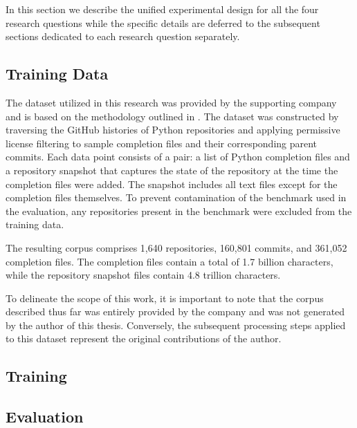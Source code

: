 In this section we describe the unified experimental design for all the four research questions while the specific details are deferred to the subsequent sections dedicated to each research question separately. %

\subsection{Training Data}

The dataset utilized in this research was provided by the supporting company and is based on the methodology outlined in \citet{bogomolov2024}. The dataset was constructed by traversing the GitHub histories of Python repositories and applying permissive license filtering to sample completion files and their corresponding parent commits. Each data point consists of a pair: a list of Python completion files and a repository snapshot that captures the state of the repository at the time the completion files were added. The snapshot includes all text files except for the completion files themselves. To prevent contamination of the benchmark used in the evaluation, any repositories present in the benchmark were excluded from the training data.

The resulting corpus comprises 1,640 repositories, 160,801 commits, and 361,052 completion files. The completion files contain a total of 1.7 billion characters, while the repository snapshot files contain 4.8 trillion characters.

To delineate the scope of this work, it is important to note that the corpus described thus far was entirely provided by the company and was not generated by the author of this thesis. Conversely, the subsequent processing steps applied to this dataset represent the original contributions of the author.


\subsection{Training}


\subsection{Evaluation}\label{sec:evaluation}

